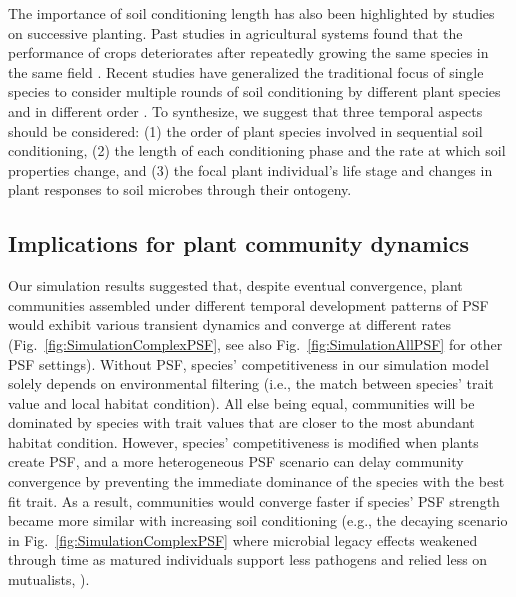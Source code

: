 The importance of soil conditioning length has also been highlighted by studies on successive planting. Past studies in agricultural systems found that the performance of crops deteriorates after repeatedly growing the same species in the same field \citep{Mazzola1999, Packer2004}.
Recent studies have generalized the traditional focus of single species to consider multiple rounds of soil conditioning by different plant species and in different order \citep{Mariotte2018, Wubs2017, Bezemer2018}.
To synthesize, we suggest that three temporal aspects should be considered: (1) the order of plant species involved in sequential soil conditioning, (2) the length of each conditioning phase and the rate at which soil properties change, and (3) the focal plant individual's life stage and changes in plant responses to soil microbes through their ontogeny. 
\par



\subsection*{Implications for plant community dynamics}
Our simulation results suggested that, despite eventual convergence, plant communities assembled under different temporal development patterns of PSF would exhibit various transient dynamics and converge at different rates (Fig.~\ref{fig:SimulationComplexPSF}, see also Fig.~\ref{fig:SimulationAllPSF} for other PSF settings).  
Without PSF, species' competitiveness in our simulation model solely depends on environmental filtering (i.e., the match between species' trait value and local habitat condition). All else being equal, communities will be dominated by species with trait values that are closer to the most abundant habitat condition. However, species' competitiveness is modified when plants create PSF, and a more heterogeneous PSF scenario can delay community convergence by preventing the immediate dominance of the species with the best fit trait. 
As a result, communities would converge faster if species' PSF strength became more similar with increasing soil conditioning (e.g., the decaying scenario in Fig.~\ref{fig:SimulationComplexPSF} where microbial legacy effects weakened through time as matured individuals support less pathogens and relied less on mutualists, \citealp{Reinhart2010}).
\par


